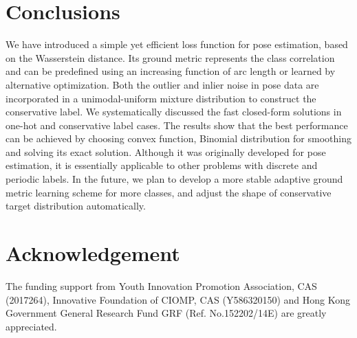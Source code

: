 \section{Conclusions}
We have introduced a simple yet efficient loss function for pose estimation, based on the Wasserstein distance. Its ground metric represents the class correlation and can be predefined using an increasing function of arc length or learned by alternative optimization. Both the outlier and inlier noise in pose data are incorporated in a unimodal-uniform mixture distribution to construct the conservative label. We systematically discussed the fast closed-form solutions in one-hot and conservative label cases. The results show that the best performance can be achieved by choosing convex function, Binomial distribution for smoothing and solving its exact solution. Although it was originally developed for pose estimation, it is essentially applicable to other problems with discrete and periodic labels. In the future, we plan to develop a more stable adaptive ground metric learning scheme for more classes, and adjust the shape of conservative target distribution automatically.



\section{Acknowledgement}
The funding support from Youth Innovation Promotion Association, CAS (2017264), Innovative Foundation of
CIOMP, CAS (Y586320150) and Hong Kong Government General Research Fund GRF (Ref. No.152202/14E) are greatly appreciated.

